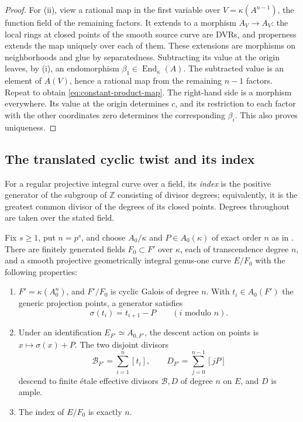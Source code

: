 \begin{proof}
For (ii), view a rational map in the first variable over
$V=\kappa(A^{n-1})$, the function field of the remaining factors.
It extends to a morphism $A_V\to A_V$: the local rings at closed
points of the smooth source curve are DVRs, and properness extends
the map uniquely over each of them.  These extensions are morphisms
on neighborhoods and glue by separatedness.  Subtracting its value
at the origin leaves, by (i), an endomorphism
$\beta_1\in\operatorname{End}_\kappa(A)$.  The subtracted value is
an element of $A(V)$, hence a rational map from the remaining
$n-1$ factors.  Repeat to obtain \eqref{eq:constant-product-map}.
The right-hand side is a morphism everywhere.  Its value at the
origin determines $c$, and its restriction to each factor with the
other coordinates zero determines the corresponding $\beta_i$.
This also proves uniqueness.
\end{proof}

\subsection{The translated cyclic twist and its index}

For a regular projective integral curve over a field, its
\emph{index} is the positive generator of the subgroup of $\mathbb Z$
consisting of divisor degrees; equivalently, it is the greatest common
divisor of the degrees of its closed points.  Degrees throughout are
taken over the stated field.

\begin{proposition}\label{prop:twist-index}
Fix $s\geq1$, put $n=p^s$, and choose $A_0/\kappa$ and
$P\in A_0(\kappa)$ of exact order $n$ as in
.  There are finitely generated fields
$F_0\subset F'$ over $\kappa$, each of transcendence degree $n$,
and a smooth projective geometrically integral genus-one curve
$E/F_0$ with the following properties:
\begin{enumerate}[label=\textup{(\roman*)}]
\item $F'=\kappa(A_0^n)$, and $F'/F_0$ is cyclic Galois of degree
$n$.  With $t_i\in A_0(F')$ the generic projection points, a
generator satisfies
\begin{equation}\label{eq:shifted-cyclic-action}
                 \sigma(t_i)=t_{i+1}-P
                 \qquad(i\text{ modulo }n).
\end{equation}
\item Under an identification $E_{F'}\simeq A_{0,F'}$, the descent
action on points is $x\mapsto\sigma(x)+P$.  The two disjoint divisors
\begin{equation}\label{eq:twist-divisors}
       \mathcal B_{F'}=\sum_{i=1}^n[t_i],\qquad
       D_{F'}=\sum_{j=0}^{n-1}[jP]
\end{equation}
descend to finite \'{e}tale effective divisors $\mathcal B,D$ of
degree $n$ on $E$, and $D$ is ample.
\item The index of $E/F_0$ is exactly $n$.
\end{enumerate}
\end{proposition}

